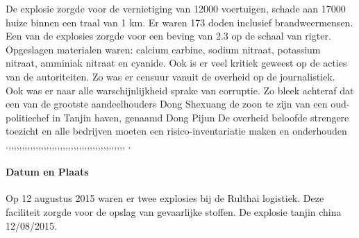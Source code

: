 \documentclass{article}
\begin{document}
 De explosie zorgde voor de vernietiging van 12000 voertuigen, schade aan 17000 huize binnen een traal van 1 km. Er waren 173 doden inclusief brandweermensen.
	Een van de explosies zorgde voor  een beving van 2.3 op de schaal van rigter.
		Opgeslagen materialen  waren: calcium carbine, sodium nitraat, potassium nitraat, amminiak nitraat en cyanide.
	Ook is er veel kritiek geweest op de acties van de autoriteiten. Zo was er censuur vanuit de overheid op de journalistiek.
	Ook was er naar alle warschijnlijkheid sprake van corruptie. Zo bleek achteraf dat een van de grootste aandeelhouders Dong Shexuang de zoon te zijn van een oud-politiechef in Tanjin haven, genaamd Dong Pijun
	De overheid beloofde strengere toezicht en alle bedrijven moeten een risico-inventariatie maken en onderhouden .\cite{pinghuang2410201TanjinFactreport},\cite{portoTanjinExplosionSight},\cite{imago17082015TanjinApartmentImages},\cite{trager14082015Chemicalblast},\cite{pangeramo27082015TanjinExplosion},\cite{ap06082020ammaniumnitrate},\cite{morris14082015TanjinIndustryImpact},\cite{milesyu20082015exposingtoxicgovlines},\cite{artemis30032016tanjininsurance},\cite{aidenxiatanjinblast},\cite{danwangTanjinflexreport},\cite{keyHighlightsTanjin},\cite{hartley13082015videofootage},\cite{odonnel01062017firetanjinblast2015},\cite{fan15082015newyorkermistrustchina},\cite{yanlidongchinamediaframingTanjin},\cite{evans27092017TnjinInsurance},\cite{jasi26032019chineschemplant},\cite{shiqingTanjinExecutiveSentence},\cite{sophiebeach15082015},\cite{hamzeh05082020BeirutBlast},\cite{chemwatch18082015TanjiinExplosion},\cite{thehindu15062019chinaExplosion},\cite{santagotimes24032019chinablast},\cite{klingecorp28042020causedTanjin},\cite{mcgarryExplosions2017},\cite{roswnfeld13082015TanjinReports},\cite{aria12082015explosionaTanjin},\cite{tremblay11022016chineseInvestigatorsTanjin},\cite{taylor13082015TanjinExplosianAftermath},\cite{associatedPresss13082013},\cite{un20082015InvestigationTanjin},\cite{france2412082015TnjinExplosion},\cite{npr14082015TanjinCause},\cite{bbc05022016TanjinResponsibles},\cite{CBodeen15082015TanjinExplosion},\cite{reutersTanjinInsurance},\cite{yu082016evaluationTanjin2015},\cite{wiki2015TanjinExplosions},\cite{bbc17082015whathappenedTanjin},\cite{mortimer19082016taijinexplosioncrater},\cite{internationallabourofficeChmControlTooliit},\cite{euTaxationCustomsICSC},
	\cite{iloWHOChemSafetyCards}.
	\paragraph{Datum en Plaats} 	\newline \indent 
		Op 12 augustus 2015 waren er twee explosies bij de Rulthai logistiek. Deze faciliteit zorgde voor de opslag van  gevaarlijke stoffen.
		De explosie tanjin china 12/08/2015. 
\end{document}
